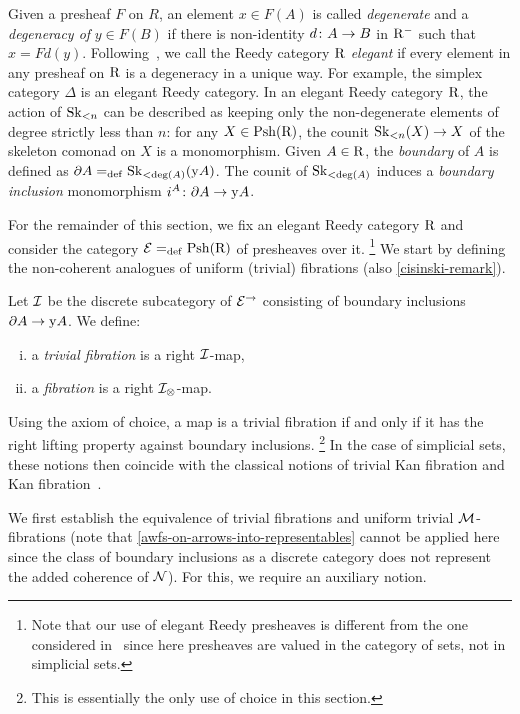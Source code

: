 \documentclass[reqno,10pt,a4paper,oneside,draft]{amsart}
\begin{document}
Given a presheaf $F$ on $R$, an element $x \in F(A)$ is called \emph{degenerate} and a \emph{degeneracy of} $y \in F(B)$ if there is non-identity $d \co A \to B$ in $\Rm$ such that $x = Fd(y)$.
Following~\cite{bergner-rezk-elegant}, we call the Reedy category $\R$ \emph{elegant} if every element in any presheaf on $\R$ is a degeneracy in a unique way.
For example, the simplex category $\Delta$ is an elegant Reedy category.
In an elegant Reedy category $\R$, the action of $\Sk_{<n}$ can be described as keeping only the non-degenerate elements of degree strictly less than $n$: for any $X \in \Psh(\R)$, the counit $\Sk_{<n}(X) \to X$ of the skeleton comonad on $X$ is a monomorphism.
Given $A \in \R$, the \emph{boundary} of $A$ is defined as $\partial A \defeq \Sk_{<\deg(A)}(\yon A)$.
The counit of $\Sk_{<\deg(A)}$ induces a \emph{boundary inclusion} monomorphism $i^A \co \partial A \to \yon A$.

\medskip

For the remainder of this section, we fix an elegant Reedy category $\R$ and consider the category $\calE \defeq \Rhat$ of presheaves over it.%
\footnote{Note that our use of elegant Reedy presheaves is different from the one considered in~\cite{shulman:reedy} since here presheaves are valued in the category of sets, not in simplicial sets.}
We start by defining the non-coherent analogues of uniform (trivial) fibrations (\cf also \cref{cisinski-remark}).

\begin{definition}
Let $\cal{I}$ be the discrete subcategory of $\catE^{\to}$ consisting of boundary inclusions $\partial A \to \yon A$.
We define:
\begin{enumerate}[(i)]
\item a \emph{trivial fibration} is a right $\cal{I}$-map,
\item a \emph{fibration} is a right $\cal{I}_\otimes$-map.
\end{enumerate}
\end{definition}

Using the axiom of choice, a map is a trivial fibration if and only if it has the right lifting property against boundary inclusions.%
\footnote{This is essentially the only use of choice in this section.}
In the case of simplicial sets, these notions then coincide with the classical notions of trivial Kan fibration and Kan fibration~\cite[Chap.~IV, Sec.~2]{gabriel-zisman:calculus-of-fractions}.

\medskip

We first establish the equivalence of trivial fibrations and uniform trivial $\cal{M}$-fibrations (note that \cref{awfs-on-arrows-into-representables} cannot be applied here since the class of boundary inclusions as a discrete category does not represent the added coherence of $\cal{N}$).
For this, we require an auxiliary notion.
\end{document}
